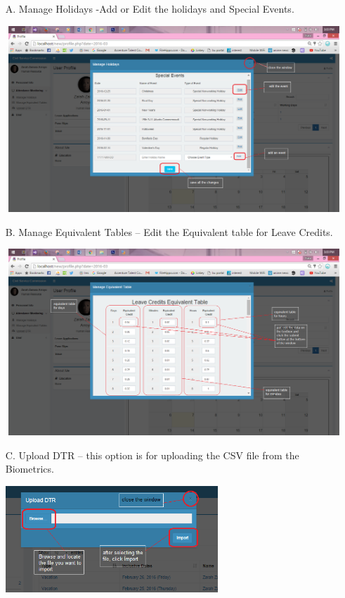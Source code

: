 \begin{enumerate}
	\item[A.] Manage Holidays -Add or Edit the holidays and Special Events. \\
	\begin{center}
		\includegraphics[width=14cm,height=7cm]{image/Holidays.png}
	\end{center}
	\item[B.] Manage Equivalent Tables – Edit the Equivalent table for Leave Credits. \\
	\begin{center}
		\includegraphics[width=14cm,height=7cm]{image/LCequi.png}
	\end{center}
	\item[C.] Upload DTR – this option is for uploading the CSV file from the Biometrics. \\
	\begin{center}
		\includegraphics[width=8cm,height=4cm]{image/upload.png}
	\end{center}
\end{enumerate}
